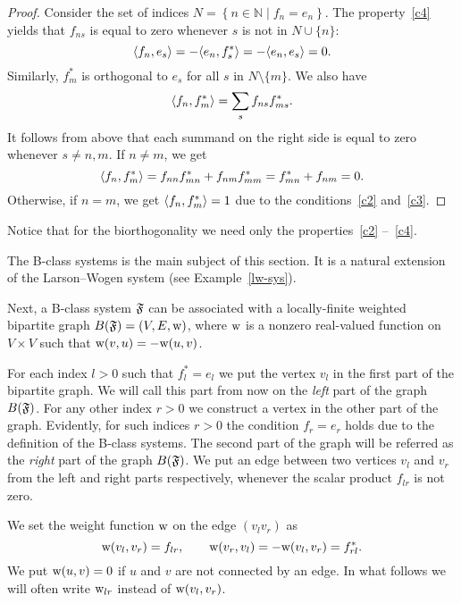\documentclass[12pt,oneside,a4paper]{amsart}
\begin{document}
    \begin{proof}
      Consider the set of indices $N = \left\{n \in \mathbb{N} \mid f_n = e_n \right\}$.
      The property~\ref{c4} yields that $f_{ns}$ is equal to zero whenever $s$ is not in $N \cup \{n\}$:
      \[
        \langle f_n, e_s \rangle = -\langle e_n, f^*_s \rangle = -\langle e_n, e_s \rangle = 0.
      \]
      Similarly, $f^*_m$ is orthogonal to $e_s$ for all $s$ in $N \setminus \{m\}$.
      We also have
      \[
        \langle f_n, f^*_m \rangle = \sum_{s} f_{ns} f_{ms}^*.
      \]
      It follows from above that each summand on the right side is equal to zero whenever $s \neq n, m$.
      If $n \neq m$, we get
      \[
        \langle f_n, f^*_m \rangle = f_{nn} f^*_{mn} + f_{nm} f^*_{mm}
        = f^*_{mn} + f_{nm} = 0.
      \]
      Otherwise, if $n = m$, we get $\langle f_n, f^*_m \rangle = 1$ due to the conditions~\ref{c2} and~\ref{c3}.
    \end{proof}
    \begin{remark}
      Notice that for the biorthogonality we need only the properties~\ref{c2} --~\ref{c4}.
    \end{remark}
    The B-class systems is the main subject of this section.
    It is a natural extension of the Larson--Wogen system (see Example~\ref{lw-sys}).

    Next, a B-class system $\mathfrak{F}$ can be associated with a
      locally-finite weighted bipartite graph $B(\mathfrak{F}) = (V, E, \mathrm{w})$, where $\mathrm{w}$ is a
      nonzero real-valued function on $V\times V$ such that $\mathrm{w}(v, u) = -\mathrm{w}(u, v)$.

    For each index $l > 0$ such that $f^*_l = e_l$ we put the vertex $v_l$ in the first part of the bipartite graph.
    We will call this part from now on the \emph{left} part of the graph $B(\mathfrak{F})$.
    For any other index $r > 0$ we construct a vertex in the other part of the graph.
    Evidently, for such indices $r > 0$ the condition $f_r = e_r$ holds due to the definition of the B-class systems.
    The second part of the graph will be referred as the \emph{right} part of the graph $B(\mathfrak{F})$.
    We put an edge between two vertices $v_l$ and $v_r$ from the left and right parts respectively,
      whenever the scalar product $f_{lr}$ is not zero.

    We set the weight function $\mathrm{w}$ on the edge $(v_l v_r)$ as
    \begin{equation}
      \label{def-wt}
      \mathrm{w}(v_l, v_r) = f_{lr}, \qquad \mathrm{w}(v_r, v_l) = -\mathrm{w}(v_l, v_r) = f_{rl}^*.
    \end{equation}
    We put $\mathrm{w}(u, v) = 0$ if $u$ and $v$ are not connected by an edge.
    In what follows we will often write $\mathrm{w}_{lr}$ instead of $\mathrm{w}(v_l, v_r)$.
\end{document}
